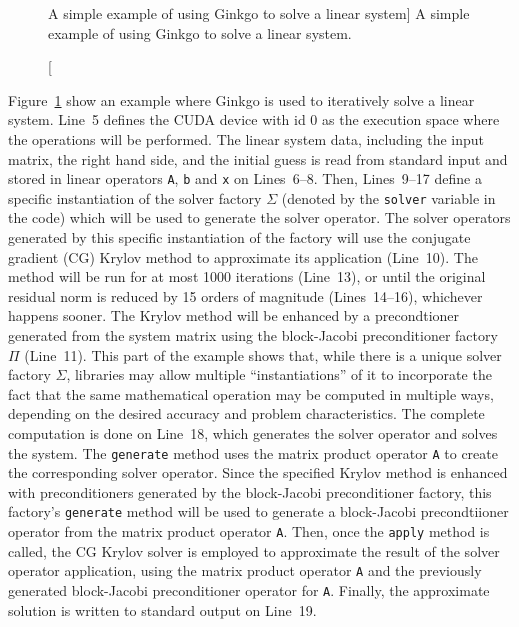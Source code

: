 \begin{figure}
\begin{center}

\end{center}
\caption
[A simple example of using Ginkgo to solve a linear system]
{A simple example of using Ginkgo to solve a linear system.}
\label{conclusion:fig:ginkgo-example}
\end{figure}

Figure~\ref{conclusion:fig:ginkgo-example} show an example where Ginkgo is used
to iteratively solve a linear system. Line~5 defines the CUDA device with id 0
as the execution space where the operations will be performed. The linear system
data, including the input matrix, the right hand side, and the initial guess is
read from standard input and stored in linear operators \texttt{A}, \texttt{b}
and \texttt{x} on Lines~6--8. Then, Lines~9--17 define a specific instantiation
of the solver factory $\Sigma$ (denoted by the \texttt{solver} variable in the
code) which will be used to generate the solver operator. The solver operators
generated by this specific instantiation of the factory will use the conjugate
gradient (CG) Krylov method to approximate its application (Line~10). The method
will be run for at most 1000 iterations (Line~13), or until the original
residual norm is reduced by 15 orders of magnitude (Lines~14--16), whichever
happens sooner. The Krylov method will be enhanced by a precondtioner generated
from the system matrix using the block-Jacobi preconditioner factory $\Pi$
(Line~11). This part of the example shows that, while there is a unique solver
factory $\Sigma$, libraries may allow multiple ``instantiations'' of it to
incorporate the fact that the same mathematical operation may be computed in
multiple ways, depending on the desired accuracy and problem characteristics.
The complete computation is done on Line~18, which generates the solver operator
and solves the system. The \texttt{generate} method uses the matrix product
operator \texttt{A} to create the corresponding solver operator.
Since the specified Krylov method is enhanced with preconditioners generated
by the block-Jacobi preconditioner factory, this factory's \texttt{generate}
method will be used to generate a block-Jacobi precondtiioner operator from the
matrix product operator \texttt{A}. Then, once the \texttt{apply} method is
called, the CG Krylov solver is employed to approximate the result of the solver
operator application, using the matrix product operator \texttt{A} and the
previously generated block-Jacobi preconditioner operator for \texttt{A}.
Finally, the approximate solution is written to standard output on Line~19.
